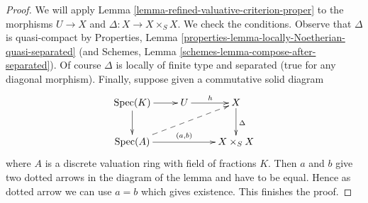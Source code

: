\documentclass[10pt,a4paper]{amsart}
\theoremstyle{plain}
\theoremstyle{definition}
\theoremstyle{remark}
\numberwithin{equation}{subsection}
\def\Spec{\mathop{\mathrm{Spec}}}
\begin{document}
\begin{proof}
We will apply Lemma \ref{lemma-refined-valuative-criterion-proper}
to the morphisms $U \to X$ and $\Delta : X \to X \times_S X$.
We check the conditions. Observe that $\Delta$ is quasi-compact by
Properties, Lemma \ref{properties-lemma-locally-Noetherian-quasi-separated}
(and Schemes, Lemma \ref{schemes-lemma-compose-after-separated}).
Of course $\Delta$ is locally of finite type and separated (true
for any diagonal morphism).
Finally, suppose given a commutative solid diagram
$$
\xymatrix{
\Spec(K) \ar[r] \ar[d] & U \ar[r]^h & X \ar[d]^\Delta \\
\Spec(A) \ar[rr]^{(a, b)} \ar@{-->}[rru] & & X \times_S X
}
$$
where $A$ is a discrete valuation ring with field of fractions $K$.
Then $a$ and $b$ give two dotted arrows in the diagram of the lemma
and have to be equal. Hence as dotted arrow we can use $a = b$
which gives existence. This finishes the proof.
\end{proof}
\end{document}
